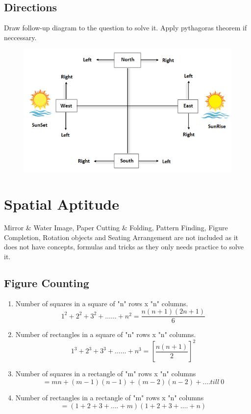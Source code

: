\subsection{Directions}
Draw follow-up diagram to the question to solve it. Apply pythagoras theorem if neccessary.
\begin{figure}[h!]
    \centering
    \includegraphics[width=\linewidth]{images/direction-sense.png}
\end{figure}


\section{Spatial Aptitude}
Mirror \& Water Image, Paper Cutting \& Folding, Pattern Finding, Figure Completion, Rotation objects and Seating Arrangement are not included as it does not have concepts, formulas and tricks as they only needs practice to solve it.
\subsection{Figure Counting}
\begin{enumerate}
    \item Number of squares in a square of "n" rows x "n" columns.
    \[1^2+2^2+3^2+\ldots\ldots+n^2=\frac{n(n+1)(2n+1)}{6}\]
    \item Number of rectangles in a square of "n" rows x "n" columns.
    \[1^3+2^3+3^3+\ldots\ldots+n^3=\left[ \frac{n(n+1)}{2}\right]^2\]
    \item Number of squares in a rectangle of "m" rows x "n" columns\
    \[=mn+(m-1)(n-1)+(m-2)(n-2)+\ldots.till\ 0\]
    \item Number of rectangles in a rectangle of "m" rows x "n" columns
    \[=(1+2+3+\ldots.+m)(1+2+3+\ldots.+n)\]
\end{enumerate}


